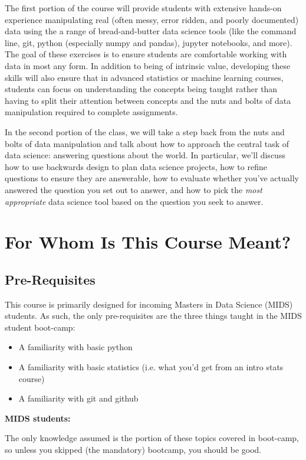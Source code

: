 \documentclass[12pt]{article}
\begin{document}
The first portion of the course will provide students with extensive hands-on experience manipulating real (often messy, error ridden, and poorly documented) data using the a range of bread-and-butter data science tools (like the command line, git, python (especially numpy and pandas), jupyter notebooks, and more). The goal of these exercises is to ensure students are comfortable working with data in most any form. In addition to being of intrinsic value, developing these skills will also ensure that in advanced statistics or machine learning courses, students can focus on understanding the concepts being taught rather than having to split their attention between concepts and the nuts and bolts of data manipulation required to complete assignments.

In the second portion of the class, we will take a step back from the nuts and bolts of data manipulation and talk about how to approach the central task of data science: answering questions about the world. In particular, we'll discuss how to use backwards design to plan data science projects, how to refine questions to ensure they are answerable, how to evaluate whether you've actually answered the question you set out to answer, and how to pick the \emph{most appropriate} data science tool based on the question you seek to answer.


\section{For Whom Is This Course Meant?}

\subsection{Pre-Requisites}

This course is primarily designed for incoming Masters in Data Science (MIDS) students. As such, the only pre-requisites are the three things taught in the MIDS student boot-camp:

\begin{itemize}
	\item A familiarity with basic python
	\item A familiarity with basic statistics (i.e. what you'd get from an intro stats course)
	\item A familiarity with git and github
\end{itemize}

\textbf{MIDS students:}

The only knowledge assumed is the portion of these topics covered in boot-camp, so unless you skipped (the mandatory) bootcamp, you should be good.
\end{document}
